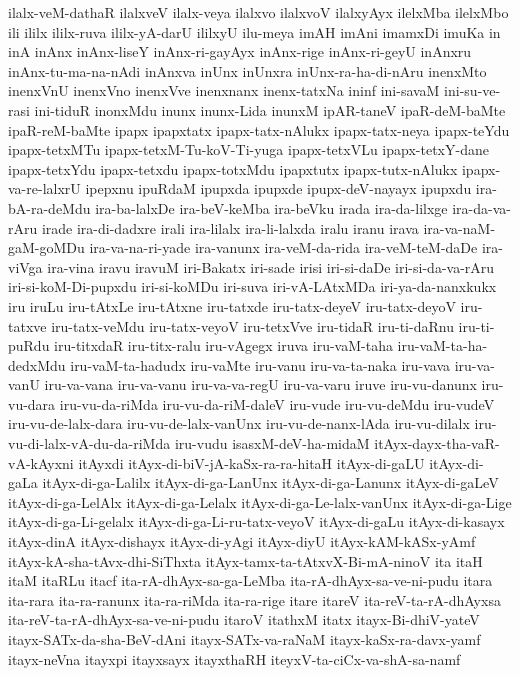 {ilalx-veM-dathaR
ilalxveV
ilalx-veya
ilalxvo
ilalxvoV
ilalxyAyx
ilelxMba
ilelxMbo
ili
ililx
ililx-ruva
ililx-yA-darU
ililxyU
ilu-meya
imAH
imAni
imamxDi
imuKa
in
inA
inAnx
inAnx-liseY
inAnx-ri-gayAyx
inAnx-rige
inAnx-ri-geyU
inAnxru
inAnx-tu-ma-na-nAdi
inAnxva
inUnx
inUnxra
inUnx-ra-ha-di-nAru
inenxMto
inenxVnU
inenxVno
inenxVve
inenxnanx
inenx-tatxNa
ininf
ini-savaM
ini-su-ve-rasi
ini-tiduR
inonxMdu
inunx
inunx-Lida
inunxM
ipAR-taneV
ipaR-deM-baMte
ipaR-reM-baMte
ipapx
ipapxtatx
ipapx-tatx-nAlukx
ipapx-tatx-neya
ipapx-teYdu
ipapx-tetxMTu
ipapx-tetxM-Tu-koV-Ti-yuga
ipapx-tetxVLu
ipapx-tetxY-dane
ipapx-tetxYdu
ipapx-tetxdu
ipapx-totxMdu
ipapxtutx
ipapx-tutx-nAlukx
ipapx-va-re-lalxrU
ipepxnu
ipuRdaM
ipupxda
ipupxde
ipupx-deV-nayayx
ipupxdu
ira-bA-ra-deMdu
ira-ba-lalxDe
ira-beV-keMba
ira-beVku
irada
ira-da-lilxge
ira-da-va-rAru
irade
ira-di-dadxre
irali
ira-lilalx
ira-li-lalxda
iralu
iranu
irava
ira-va-naM-gaM-goMDu
ira-va-na-ri-yade
ira-vanunx
ira-veM-da-rida
ira-veM-teM-daDe
ira-viVga
ira-vina
iravu
iravuM
iri-Bakatx
iri-sade
irisi
iri-si-daDe
iri-si-da-va-rAru
iri-si-koM-Di-pupxdu
iri-si-koMDu
iri-suva
iri-vA-LAtxMDa
iri-ya-da-nanxkukx
iru
iruLu
iru-tAtxLe
iru-tAtxne
iru-tatxde
iru-tatx-deyeV
iru-tatx-deyoV
iru-tatxve
iru-tatx-veMdu
iru-tatx-veyoV
iru-tetxVve
iru-tidaR
iru-ti-daRnu
iru-ti-puRdu
iru-titxdaR
iru-titx-ralu
iru-vAgegx
iruva
iru-vaM-taha
iru-vaM-ta-ha-dedxMdu
iru-vaM-ta-hadudx
iru-vaMte
iru-vanu
iru-va-ta-naka
iru-vava
iru-va-vanU
iru-va-vana
iru-va-vanu
iru-va-va-regU
iru-va-varu
iruve
iru-vu-danunx
iru-vu-dara
iru-vu-da-riMda
iru-vu-da-riM-daleV
iru-vude
iru-vu-deMdu
iru-vudeV
iru-vu-de-lalx-dara
iru-vu-de-lalx-vanUnx
iru-vu-de-nanx-lAda
iru-vu-dilalx
iru-vu-di-lalx-vA-du-da-riMda
iru-vudu
isasxM-deV-ha-midaM
itAyx-dayx-tha-vaR-vA-kAyxni
itAyxdi
itAyx-di-biV-jA-kaSx-ra-ra-hitaH
itAyx-di-gaLU
itAyx-di-gaLa
itAyx-di-ga-Lalilx
itAyx-di-ga-LanUnx
itAyx-di-ga-Lanunx
itAyx-di-gaLeV
itAyx-di-ga-LelAlx
itAyx-di-ga-Lelalx
itAyx-di-ga-Le-lalx-vanUnx
itAyx-di-ga-Lige
itAyx-di-ga-Li-gelalx
itAyx-di-ga-Li-ru-tatx-veyoV
itAyx-di-gaLu
itAyx-di-kasayx
itAyx-dinA
itAyx-dishayx
itAyx-di-yAgi
itAyx-diyU
itAyx-kAM-kASx-yAmf
itAyx-kA-sha-tAvx-dhi-SiThxta
itAyx-tamx-ta-tAtxvX-Bi-mA-ninoV
ita
itaH
itaM
itaRLu
itacf
ita-rA-dhAyx-sa-ga-LeMba
ita-rA-dhAyx-sa-ve-ni-pudu
itara
ita-rara
ita-ra-ranunx
ita-ra-riMda
ita-ra-rige
itare
itareV
ita-reV-ta-rA-dhAyxsa
ita-reV-ta-rA-dhAyx-sa-ve-ni-pudu
itaroV
itathxM
itatx
itayx-Bi-dhiV-yateV
itayx-SATx-da-sha-BeV-dAni
itayx-SATx-va-raNaM
itayx-kaSx-ra-davx-yamf
itayx-neVna
itayxpi
itayxsayx
itayxthaRH
iteyxV-ta-ciCx-va-shA-sa-namf
}

